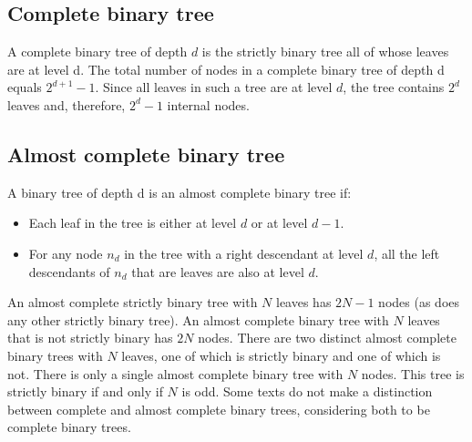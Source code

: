 \documentclass{report}
\begin{document}
    \bigbreak \noindent 
    \subsection{Complete binary tree}
    \bigbreak \noindent 
    A complete binary tree of depth $d$ is the strictly binary tree all of whose leaves are at level d.
    \bigbreak \noindent 
    The total number of nodes in a complete binary tree of depth d equals $2^{d+1} -1 $. Since all leaves in such a tree are at level $d$, the tree contains $2^{d}$ leaves and, therefore, $2^{d}-1$ internal nodes.
    \bigbreak \noindent 
    \subsection{Almost complete binary tree}
    \bigbreak \noindent 
    A binary tree of depth d is an almost complete binary tree if:
    \begin{itemize}
        \item Each leaf in the tree is either at level $d$ or at level $d-1$.
        \item For any node $n_{d}$ in the tree with a right descendant at level $d$, all the left descendants of $n_{d}$ that are leaves are also at level $d$.
    \end{itemize}
    \bigbreak \noindent 
    An almost complete strictly binary tree with $N$ leaves has $2N-1$ nodes (as does any other strictly binary tree). An almost complete binary tree with $N$ leaves that is not strictly binary has $2N$ nodes. There are two distinct almost complete binary trees with $N$ leaves, one of which is strictly binary and one of which is not.
    \bigbreak \noindent 
    There is only a single almost complete binary tree with $N$ nodes. This tree is strictly binary if and only if $N$ is odd.
    \bigbreak \noindent 
    Some texts do not make a distinction between complete and almost complete binary trees, considering both to be complete binary trees.










   
    

    







    
    
\end{document}
